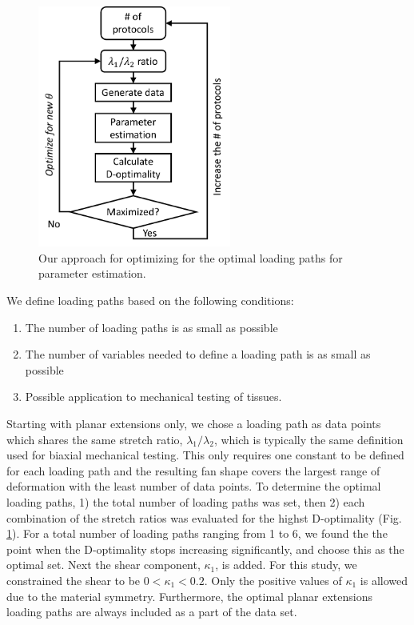 \begin{figure}
\centering
\includegraphics[width=2.5in]{Images/chapter5/optimaldesign}
\caption{Our approach for optimizing for the optimal loading paths for parameter estimation.}
\label{fig:optimaldesign}
\end{figure}

    
    We define loading paths based on the following conditions: 
\begin{enumerate}
\item The number of loading paths is as small as possible
\item The number of variables needed to define a loading path is as small as possible
\item Possible application to mechanical testing of tissues.
\end{enumerate} 
    Starting with planar extensions only, we chose a loading path as data points which shares the same stretch ratio, $\lambda_1/\lambda_2$, which is typically the same definition used for biaxial mechanical testing. This only requires one constant to be defined for each loading path and the resulting fan shape covers the largest range of deformation with the least number of data points. To determine the optimal loading paths, 1) the total number of loading paths was set, then 2) each combination of the stretch ratios was evaluated for the highst D-optimality (Fig. \ref{fig:optimaldesign}). For a total number of loading paths ranging from 1 to 6, we found the the point when the D-optimality stops increasing significantly, and choose this as the optimal set. Next the shear component, $\kappa_1$, is added. For this study, we constrained the shear to be $0<\kappa_1<0.2$. Only the positive values of $\kappa_1$ is allowed due to the material symmetry. Furthermore, the optimal planar extensions loading paths are always included as a part of the data set.















